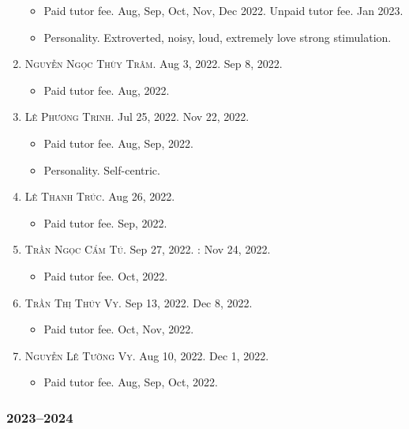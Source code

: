 \documentclass{article}
\begin{document}
\begin{enumerate}
\begin{itemize}
		\item {\sf Paid tutor fee.} Aug, Sep, Oct, Nov, Dec 2022. {\sf Unpaid tutor fee.} Jan 2023.
		\item {\sf Personality.} Extroverted, noisy, loud, extremely love strong stimulation.
	\end{itemize}
	\item \textsc{Nguyễn Ngọc Thùy Trâm.} {\sf[In]} Aug 3, 2022. {\sf[Out]} Sep 8, 2022.
	\begin{itemize}
		\item {\sf Paid tutor fee.} Aug, 2022.
	\end{itemize}
	\item \textsc{Lê Phương Trinh.} {\sf[In]} Jul 25, 2022. {\sf[Out]} Nov 22, 2022.
	\begin{itemize}
		\item {\sf Paid tutor fee.} Aug, Sep, 2022.
		\item {\sf Personality.} Self-centric.
	\end{itemize}
	\item \textsc{Lê Thanh Trúc.} {\sf[In]} Aug 26, 2022. {\sf[Out]}
	\begin{itemize}
		\item {\sf Paid tutor fee.} Sep, 2022.
	\end{itemize}
	\item \textsc{Trần Ngọc Cẩm Tú.} {\sf[In]} Sep 27, 2022. {}: Nov 24, 2022.
	\begin{itemize}
		\item {\sf Paid tutor fee.} Oct, 2022.
	\end{itemize}
	\item \textsc{Trần Thị Thúy Vy.} {\sf[In]} Sep 13, 2022. {\sf[Out]} Dec 8, 2022.
	\begin{itemize}
		\item {\sf Paid tutor fee.} Oct, Nov, 2022.
	\end{itemize}
	\item \textsc{Nguyễn Lê Tường Vy.} {\sf[In]} Aug 10, 2022. {\sf[Out]} Dec 1, 2022.
	\begin{itemize}
		\item {\sf Paid tutor fee.} Aug, Sep, Oct, 2022.
	\end{itemize}
\end{enumerate}

\subsubsection{2023--2024}
\end{document}
